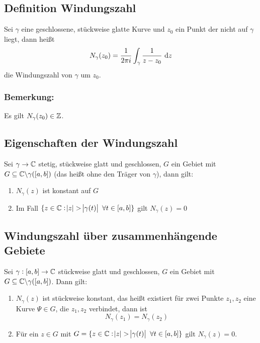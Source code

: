\subsection{Definition Windungszahl}
Sei $\gamma$ eine geschlossene, stückweise glatte Kurve und $z_0$ ein Punkt der nicht auf $\gamma$ liegt, dann heißt
\begin{equation*}
    N_\gamma (z_0) = \frac{1}{2\pi i} \int_\gamma \frac{1}{z-z_0} \text{ d}z 
\end{equation*}
die Windungszahl von $\gamma$ um $z_0$.

\subsubsection{Bemerkung:}
Es gilt $N_\gamma(z_0) \in \mathbb{Z}$.

\subsection{Eigenschaften der Windungszahl}
Sei $\gamma \to \mathbb{C}$ stetig, stückweise glatt und geschlossen, $G$ ein Gebiet mit 
$G \subseteq \mathbb{C} \backslash \gamma([a,b])$ (das heißt ohne den Träger von $\gamma$), dann gilt:
\begin{enumerate}
    \item $N_\gamma(z)$ ist konstant auf $G$
    \item Im Fall $\{z \in \mathbb{C}: \abs{z} > \abs{\gamma(t)}\ \forall t \in [a,b]\}$ gilt $N_\gamma(z) = 0$
\end{enumerate}

\subsection{Windungszahl über zusammenhängende Gebiete}
Sei $\gamma: [a,b] \to \mathbb{C}$ stückweise glatt und geschlossen, $G$ ein Gebiet mit 
$G \subseteq \mathbb{C} \backslash \gamma([a,b])$. Dann gilt:
\begin{enumerate}
    \item $N_\gamma(z)$ ist stückweise konstant, das heißt existiert für zwei Punkte $z_1, z_2$ eine Kurve
        $\Psi \in G$, die $z_1, z_2$ verbindet, dann ist
        \begin{equation*}
            N_\gamma(z_1) = N_\gamma(z_2)
        \end{equation*}
    \item Für ein $z \in G$ mit $G = \{z \in \mathbb{C}: \abs{z} > \abs{\gamma(t)}\ \forall t \in [a,b]\}$ gilt
        $N_\gamma(z) = 0$.
\end{enumerate}

